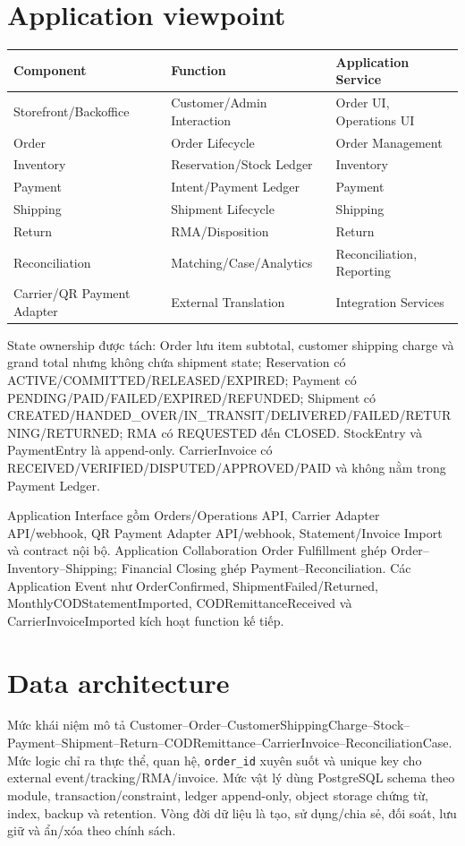 \documentclass[12pt,a4paper]{report}
\newcommand{\code}[1]{\texttt{#1}}
\begin{document}
\section{Application viewpoint}
\begin{longtable}{p{}p{}p{}}
\toprule
\textbf{Component} & \textbf{Function} & \textbf{Application Service}\\
\midrule\endhead
Storefront/Backoffice & Customer/Admin Interaction & Order UI, Operations UI\\
Order & Order Lifecycle & Order Management\\
Inventory & Reservation/Stock Ledger & Inventory\\
Payment & Intent/Payment Ledger & Payment\\
Shipping & Shipment Lifecycle & Shipping\\
Return & RMA/Disposition & Return\\
Reconciliation & Matching/Case/Analytics & Reconciliation, Reporting\\
Carrier/QR Payment Adapter & External Translation & Integration Services\\
\bottomrule
\end{longtable}

State ownership được tách: Order lưu item subtotal, customer shipping charge và grand total nhưng không chứa shipment state; Reservation có ACTIVE/COMMITTED/RELEASED/EXPIRED; Payment có PENDING/PAID/FAILED/EXPIRED/REFUNDED; Shipment có CREATED/HANDED\_OVER/IN\_TRANSIT/DELIVERED/FAILED/RETURNING/RETURNED; RMA có REQUESTED đến CLOSED. StockEntry và PaymentEntry là append-only. CarrierInvoice có RECEIVED/VERIFIED/DISPUTED/APPROVED/PAID và không nằm trong Payment Ledger.

Application Interface gồm Orders/Operations API, Carrier Adapter API/webhook, QR Payment Adapter API/webhook, Statement/Invoice Import và contract nội bộ. Application Collaboration Order Fulfillment ghép Order--Inventory--Shipping; Financial Closing ghép Payment--Reconciliation. Các Application Event như OrderConfirmed, ShipmentFailed/Returned, MonthlyCODStatementImported, CODRemittanceReceived và CarrierInvoiceImported kích hoạt function kế tiếp.

\section{Data architecture}
Mức khái niệm mô tả Customer--Order--CustomerShippingCharge--Stock--Payment--Shipment--Return--CODRemittance--CarrierInvoice--ReconciliationCase. Mức logic chỉ ra thực thể, quan hệ, \code{order\_id} xuyên suốt và unique key cho external event/tracking/RMA/invoice. Mức vật lý dùng PostgreSQL schema theo module, transaction/constraint, ledger append-only, object storage chứng từ, index, backup và retention. Vòng đời dữ liệu là tạo, sử dụng/chia sẻ, đối soát, lưu giữ và ẩn/xóa theo chính sách.
\end{document}
